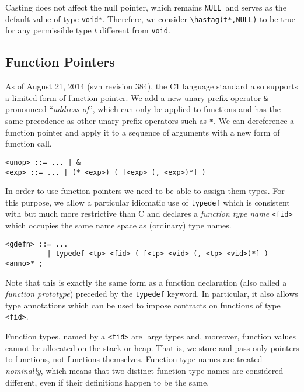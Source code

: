 \documentclass[11pt]{article}
\newcommand{\vnull}{\texttt{NULL}}
\newcommand{\tvoid}{\texttt{void}}
\begin{document}
Casting does not affect the null pointer, which remains \vnull\ and
serves as the default value of type \verb'void*'.  Therefere, we
consider \verb'\hastag(t*,NULL)' to be true for any permissible type
$t$ different from \tvoid.

\subsection{Function Pointers}

As of August 21, 2014 (svn revision 384), the C1 language standard
also supports a limited form of function pointer.  We add a new unary
prefix operator \verb'&' pronounced ``\emph{address of}'', which can
only be applied to functions and has the same precedence as other
unary prefix operators such as \verb'*'.  We can dereference a
function pointer and apply it to a sequence of arguments with a new
form of function call.

\begin{small}
\begin{verbatim}
<unop> ::= ... | &
<exp> ::= ... | (* <exp>) ( [<exp> (, <exp>)*] )
\end{verbatim}
\end{small}

In order to use function pointers we need to be able to assign them
types.  For this purpose, we allow a particular idiomatic use of
\verb'typedef' which is consistent with but much more restrictive than
C and declares a \emph{function type name} \verb'<fid>' which occupies
the same name space as (ordinary) type names.

\begin{small}
\begin{verbatim}
<gdefn> ::= ...
          | typedef <tp> <fid> ( [<tp> <vid> (, <tp> <vid>)*] ) <anno>* ;
\end{verbatim}
\end{small}

Note that this is exactly the same form as a function declaration
(also called a \emph{function prototype}) preceded by the
\verb'typedef' keyword.  In particular, it also allows type
annotations which can be used to impose contracts on functions of type
\verb'<fid>'.

Function types, named by a \verb'<fid>' are large types and, moreover,
function values cannot be allocated on the stack or heap.  That is, we
store and pass only pointers to functions, not functions themselves.
Function type names are treated \emph{nominally}, which means that two
distinct function type names are considered different, even if their
definitions happen to be the same.
\end{document}
